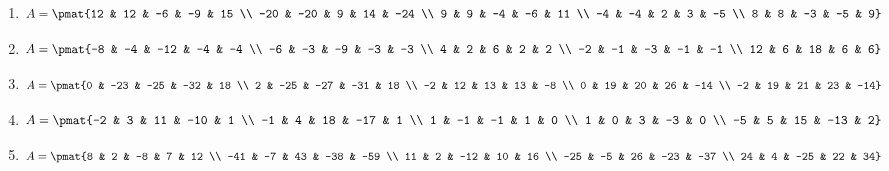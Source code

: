 \begin{enumerate}
\item

\begin{align*}
A = \pmat{12 & 12 & -6 & -9 & 15 \\ -20 & -20 & 9 & 14 & -24 \\ 9 & 9 & -4 & -6 & 11 \\ -4 & -4 & 2 & 3 & -5 \\ 8 & 8 & -3 & -5 & 9}
\end{align*}

\item

\begin{align*}
A = \pmat{-8 & -4 & -12 & -4 & -4 \\ -6 & -3 & -9 & -3 & -3 \\ 4 & 2 & 6 & 2 & 2 \\ -2 & -1 & -3 & -1 & -1 \\ 12 & 6 & 18 & 6 & 6}
\end{align*}

\item

\begin{align*}
A = \pmat{0 & -23 & -25 & -32 & 18 \\ 2 & -25 & -27 & -31 & 18 \\ -2 & 12 & 13 & 13 & -8 \\ 0 & 19 & 20 & 26 & -14 \\ -2 & 19 & 21 & 23 & -14}
\end{align*}

\item

\begin{align*}
A = \pmat{-2 & 3 & 11 & -10 & 1 \\ -1 & 4 & 18 & -17 & 1 \\ 1 & -1 & -1 & 1 & 0 \\ 1 & 0 & 3 & -3 & 0 \\ -5 & 5 & 15 & -13 & 2}
\end{align*}

\item

\begin{align*}
A = \pmat{8 & 2 & -8 & 7 & 12 \\ -41 & -7 & 43 & -38 & -59 \\ 11 & 2 & -12 & 10 & 16 \\ -25 & -5 & 26 & -23 & -37 \\ 24 & 4 & -25 & 22 & 34}
\end{align*}


\end{enumerate}
